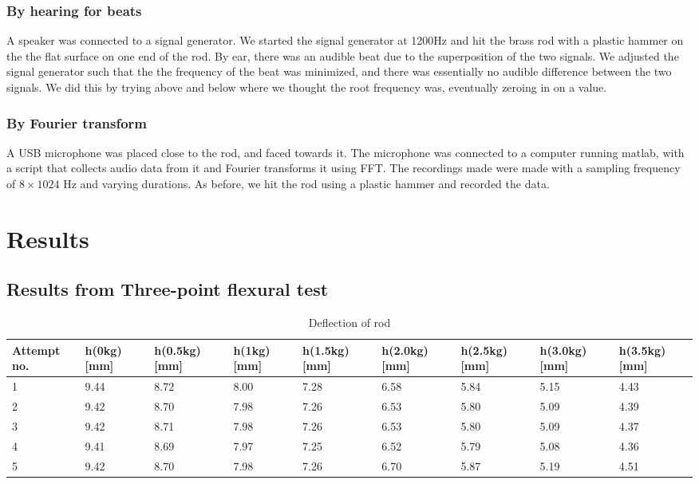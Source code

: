 \documentclass[11pt,a4paper]{article}
\begin{document}
      \subsubsection{By hearing for beats}
        A speaker was connected to a signal generator. We started the signal generator at 1200Hz and hit the brass rod with a plastic hammer on the the flat surface on one end of the rod. By ear, there was an audible beat due to the superposition of the two signals. We adjusted the signal generator such that the the frequency of the beat was minimized, and there was essentially no audible difference between the two signals. We did this by trying above and below where we thought the root frequency was, eventually zeroing in on a value.

      \subsubsection{By Fourier transform}
        A USB microphone was placed close to the rod, and faced towards it. The microphone was connected to a computer running matlab, with a script that collects audio data from it and Fourier transforms it using FFT. The recordings made were made with a sampling frequency of $8\times1024$ Hz and varying durations. As before, we hit the rod using a plastic hammer and recorded the data.


\section{\label{sect:results}Results}
  \subsection{Results from Three-point flexural test}


    \begin{table}[H]
      \caption{Deflection of rod}
      \center
      \begin{tabular}{ | p{1.2cm} | p{1.4cm} | p{1.4cm} | p{1.4cm} | p{1.4cm} | p{1.4cm} | p{1.4cm} | p{1.4cm} | p{1.4cm} |}
          \hline
          Attempt no. & h(0kg) [mm] & h(0.5kg) [mm] & h(1kg) [mm] & h(1.5kg) [mm] & h(2.0kg) [mm] & h(2.5kg) [mm] & h(3.0kg) [mm] & h(3.5kg) [mm] \\ 
          \hline
          1 & 9.44 & 8.72 & 8.00 & 7.28 & 6.58 & 5.84 & 5.15 & 4.43\\ \hline
          2 & 9.42 & 8.70 & 7.98 & 7.26 & 6.53 & 5.80 & 5.09 & 4.39\\ \hline
          3 & 9.42 & 8.71 & 7.98 & 7.26 & 6.53 & 5.80 & 5.09 & 4.37\\ \hline
          4 & 9.41 & 8.69 & 7.97 & 7.25 & 6.52 & 5.79 & 5.08 & 4.36\\ \hline
          5 & 9.42 & 8.70 & 7.98 & 7.26 & 6.70 & 5.87 & 5.19 & 4.51\\ \hline
      \end{tabular}
      \label{tab:flex}
    \end{table}
\end{document}
